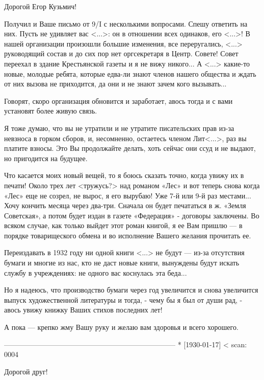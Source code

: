 \documentclass[]{memoir}
\begin{document}
Дорогой Егор Кузьмич!

 

Получил и Ваше письмо от 9/I с несколькими вопросами. Спешу ответить на них. Пусть не удивляет вас <...>: он в отношении всех одинаков, его <...>! В нашей организации произошли большие изменения, все переругались, <...> руководящий состав и до сих пор нет оргсекретаря в Центр. Совете! Совет переехал в здание Крестьянской газеты и я не вижу никого... А <...> какие-то новые, молодые ребята, которые едва-ли знают членов нашего общества и ждать от них вызова не приходится, да они и не знают зачем кого вызывать...

Говорят, скоро организация обновится и заработает, авось тогда и с вами установят более живую связь.

Я тоже думаю, что вы не утратили и не утратите писательских прав из-за невзноса в горком сборов, и, несомненно, остаетесь членом Лит<...>, раз вы платите взносы. Это Вы продолжайте делать, хоть сейчас они ссуд и не выдают, но пригодится на будущее.

Что касается моих новый вещей, то я боюсь сказать точно, когда увижу их в печати! Около трех лет <тружусь?> над романом «Лес» и вот теперь снова когда «Лес» еще не созрел, не вырос, я его вырубаю! Уже 7-й или 9-й раз местами... Хочу кончить месяца через два-три. Сначала он будет печататься в ж. «Земля Советская», а потом будет издан в газете «Федерация» - договоры заключены. Во всяком случае, как только выйдет этот роман книгой, я ее Вам пришлю — в порядке товарищеского обмена и во исполнение Вашего желания прочитать ее.

Переиздавать в 1932 году ни одной книги <...> не будут — из-за отсутствия бумаги и многие из нас, кто не даст новые книги, вынуждены будут искать службу в учреждениях: не одного вас коснулась эта беда...

Но я надеюсь, что производство бумаги через год увеличится и снова увеличится выпуск художественной литературы и тогда, - чему бы я был от души рад, - авось увижу книжку Ваших стихов последних лет!

 

А пока — крепко жму Вашу руку и желаю вам здоровья и всего хорошего.

------------------------------------------------------------------------
* [1930-01-17] <
scan: 0004


Дорогой друг!
\end{document}
